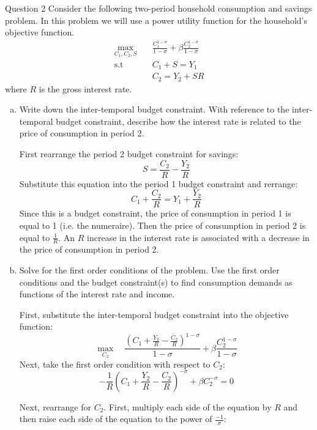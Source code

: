 \documentclass[a4paper]{article}
\begin{document}
	\begin{questionbox}{Question 2}
		Consider the following two-period household consumption and savings problem. In this problem we will use a power utility function for the household's objective function.
		\begin{align*}
			\max_{C_1,C_2,S} \quad &\frac{C_1^{1-\sigma}}{1 - \sigma} + \beta\frac{C_2^{1-\sigma}}{1-\sigma}\\
			\text{s.t} \quad &C_1 + S = Y_1\\
			&C_2 = Y_2 + SR
		\end{align*}
		where \( R \) is the gross interest rate.
		\begin{enumerate}[(a)]
			\item Write down the inter-temporal budget constraint. With reference to the inter-temporal budget constraint, describe how the interest rate is related to the price of consumption in period 2.
			\begin{explanationbox}
				First rearrange the period 2 budget constraint for savings:
				\[
					S = \frac{C_2}{R}-\frac{Y_2}{R}
				\]
				Substitute this equation into the period 1 budget constraint and rerrange:
				\[
					C_1 + \frac{C_2}{R} = Y_1 + \frac{Y_2}{R}
				\]
				Since this is a budget constraint, the price of consumption in period 1 is equal to 1 (i.e. the numeraire). Then the price of consumption in period 2 is equal to \( \frac{1}{R} \). An \( R \) increase in the interest rate is associated with a decrease in the price of consumption in period 2.
			\end{explanationbox}
			\item Solve for the first order conditions of the problem. Use the first order conditions and the budget constraint(s) to find consumption demands as functions of the interest rate and income.
			\begin{explanationbox}
				First, substitute the inter-temporal budget constraint into the objective function:
				\[
					\max_{C_2} \quad \frac{(C_1+\frac{Y_2}{R}-\frac{C_2}{R})^{1-\sigma}}{1 - \sigma} + \beta\frac{C_2^{1-\sigma}}{1-\sigma}
				\]
				Next, take the first order condition with respect to \( C_2 \):
				\[
					-\frac{1}{R}\left( C_1+\frac{Y_2}{R}-\frac{C_2}{R} \right)^{-\sigma} + \beta C_2^{-\sigma} = 0
				\]
			\end{explanationbox}
			\begin{explanationbox}
				Next, rearrange for \( C_2 \). First, multiply each side of the equation by \( R \) and then raise each side of the equation to the power of \( \frac{-1}{\sigma} \):

\end{explanationbox}
\end{enumerate}
\end{questionbox}
\end{document}
